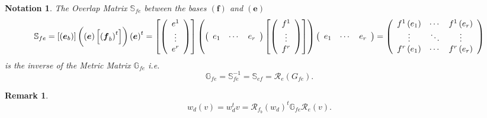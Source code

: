 \documentclass[aps,preprint]{revtex4}%
\newtheorem{notation}[theorem]{Notation}
\newtheorem{remark}[theorem]{Remark}
\begin{document}
\begin{notation}
The Overlap Matrix $\mathbb{S}_{fe}$ between the bases $\left(  \boldsymbol{f}%
\right)  $ and $\left(  \boldsymbol{e}\right)  $
\begin{equation}
\mathbb{S}_{fe}=\left[  \left(  \boldsymbol{e}_{b}\right)  \right]  \left(
\overset{}{\left(  \boldsymbol{e}\right)  \left[  \left(  \boldsymbol{f}%
_{b}\right)  ^{t}\right]  }\right)  \left(  \boldsymbol{e}\right)
^{t}=\left[  \left(
\begin{array}
[c]{c}%
e^{1}\\
\vdots\\
e^{r}%
\end{array}
\right)  \right]  \left(  \left(
\begin{array}
[c]{ccc}%
e_{1} & \cdots & e_{r}%
\end{array}
\right)  \left[  \left(
\begin{array}
[c]{c}%
f^{1}\\
\vdots\\
f^{r}%
\end{array}
\right)  \right]  \right)  \left(
\begin{array}
[c]{ccc}%
e_{1} & \cdots & e_{r}%
\end{array}
\right)  =\left(
\begin{array}
[c]{ccc}%
f^{1}\left(  e_{1}\right)   & \cdots & f^{1}\left(  e_{r}\right)  \\
\vdots & \ddots & \vdots\\
f^{r}\left(  e_{1}\right)   & \cdots & f^{r}\left(  e_{r}\right)
\end{array}
\right)
\end{equation}
is the inverse of the Metric Matrix $\mathbb{G}_{fe}$ i.e.
\begin{equation}
\mathbb{G}_{fe}=\mathbb{S}_{fe}^{-1}=\mathbb{S}_{ef}=\mathcal{R}_{e}\left(
G_{fe}\right)  .
\end{equation}

\end{notation}

\begin{remark}%
\begin{equation}
w_{d}\left(  v\right)  =w_{d}^{t}v=\mathcal{R}_{f_{b}}\left(  w_{d}\right)
^{t}\mathbb{G}_{fe}\mathcal{R}_{e}\left(  v\right)  .
\end{equation}

\end{remark}
\end{document}
